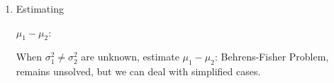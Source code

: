 \begin{enumerate}
    

    \begin{enumerate}[topsep=2pt,itemsep=2pt]
        \item \hypertarget{TwoSampletTest}{Estimating} $\mu_1-\mu_2$:
    
        When $\sigma_1^2\neq\sigma^2_2$ are unknown, estimate $\mu_1-\mu_2$: Behrens-Fisher Problem, remains unsolved, but we can deal with simplified cases. 


\end{enumerate}
\end{enumerate}
